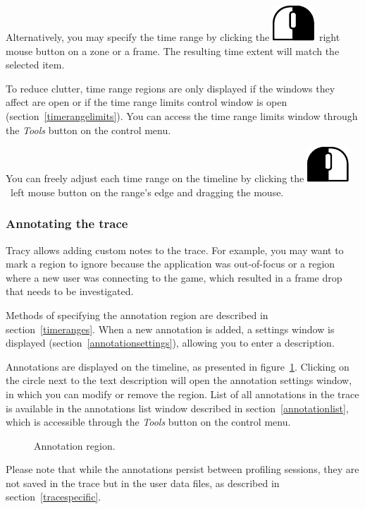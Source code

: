 \documentclass[hidelinks,titlepage,a4paper]{article}
\newcommand{\LMB}{\includegraphics[height=.8\baselineskip]{icons/lmb}}
\newcommand{\RMB}{\includegraphics[height=.8\baselineskip]{icons/rmb}}
\begin{document}
Alternatively, you may specify the time range by clicking the \RMB{}~right mouse button on a zone or a frame. The resulting time extent will match the selected item.

To reduce clutter, time range regions are only displayed if the windows they affect are open or if the time range limits control window is open (section~\ref{timerangelimits}). You can access the time range limits window through the \emph{\faTools{} Tools} button on the control menu.

You can freely adjust each time range on the timeline by clicking the \LMB{}~left mouse button on the range's edge and dragging the mouse.

\subsubsection{Annotating the trace}
\label{annotatingtrace}

Tracy allows adding custom notes to the trace. For example, you may want to mark a region to ignore because the application was out-of-focus or a region where a new user was connecting to the game, which resulted in a frame drop that needs to be investigated.

Methods of specifying the annotation region are described in section~\ref{timeranges}. When a new annotation is added, a settings window is displayed (section~\ref{annotationsettings}), allowing you to enter a description.

Annotations are displayed on the timeline, as presented in figure~\ref{annotation}. Clicking on the circle next to the text description will open the annotation settings window, in which you can modify or remove the region. List of all annotations in the trace is available in the annotations list window described in section~\ref{annotationlist}, which is accessible through the \emph{\faTools{} Tools} button on the control menu.

\begin{figure}[h]
\centering{}
\caption{Annotation region.}
\label{annotation}
\end{figure}

Please note that while the annotations persist between profiling sessions, they are not saved in the trace but in the user data files, as described in section~\ref{tracespecific}.
\end{document}

